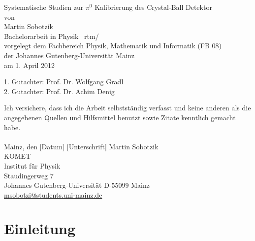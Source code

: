\documentclass[a4paper,11pt,oneside,final,german,openbib,pdftex]{scrbook}
\begin{document}

\begin{titlepage}
  \vspace*{6mm}
  \begin{center}
     {\afont Systematische Studien zur $\pi^0$ Kalibrierung des Crystal-Ball Detektor}
     \\[3.5cm]
     {\large von}
     \\[3.5cm]
     {\dfont Martin Sobotzik}
     \\[2cm]
     {\large Bachelorarbeit in Physik \ rtm/\\
        vorgelegt dem Fachbereich Physik, Mathematik und Informatik (FB 08) \/\\
        der Johannes Gutenberg-Universit\"at Mainz \/\\
        am 1. April 2012}
   \end{center}
   \vfill
   1. Gutachter: Prof. Dr. Wolfgang Gradl\\	
   2. Gutachter: Prof. Dr. Achim Denig \\
   \vfill
\end{titlepage}

\thispagestyle{empty}
Ich versichere, dass ich die Arbeit selbstst\"andig verfasst und keine 
anderen als die angegebenen Quellen und Hilfsmittel benutzt sowie 
Zitate kenntlich gemacht habe.
\\
\\[3.5cm] 
Mainz, den [Datum] [Unterschrift]
\vfill
\noindent 
Martin Sobotzik\\
KOMET\\
Institut f\"ur Physik\\
Staudingerweg 7\\
Johannes Gutenberg-Universit\"at
D-55099 Mainz\\
{\url{ msobotzi@students.uni-mainz.de}}

\renewcommand\contentsname{Inhaltsverzeichnis}
\renewcommand\figurename{Abbildung}
\renewcommand\tablename{Tabelle}
\tableofcontents
\clearpage

\mainmatter
\sloppy

\chapter{Einleitung}
\end{document}
